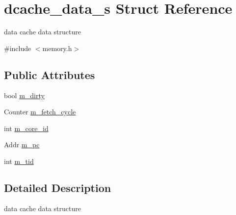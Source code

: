 \hypertarget{structdcache__data__s}{
\section{dcache\_\-data\_\-s Struct Reference}
\label{structdcache__data__s}
}


data cache data structure  




{\ttfamily \#include $<$memory.h$>$}

\subsection*{Public Attributes}
\begin{DoxyCompactItemize}
\item 
bool \hyperlink{structdcache__data__s_a7cdb5d97e38e3d809bcd15606a1c88cc}{m\_\-dirty}
\item 
Counter \hyperlink{structdcache__data__s_a5314b8ca6633a626c5f4950b4c85098e}{m\_\-fetch\_\-cycle}
\item 
int \hyperlink{structdcache__data__s_a6fec40ec8559ce4500900d904ff7f1be}{m\_\-core\_\-id}
\item 
Addr \hyperlink{structdcache__data__s_a5dfdd969951708a037337450e7ae9f36}{m\_\-pc}
\item 
int \hyperlink{structdcache__data__s_a678d12e44bf2d56cef863426858f62e4}{m\_\-tid}
\end{DoxyCompactItemize}


\subsection{Detailed Description}
data cache data structure 

